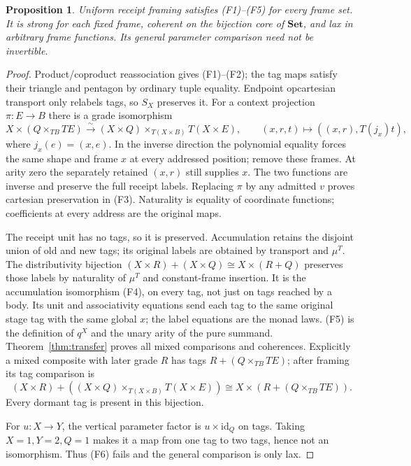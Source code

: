 \documentclass[11pt,a4paper]{article}
\newtheorem{proposition}[theorem]{Proposition}
\theoremstyle{definition}
\newcommand{\Set}{\mathbf{Set}}
\newcommand{\id}{\mathrm{id}}
\begin{document}
\begin{proposition}\label{prop:receipt-positive}
Uniform receipt framing satisfies \textup{(F1)--(F5)} for every frame set.
It is strong for each fixed frame, coherent on the bijection core of
$\Set$, and lax in arbitrary frame functions. Its general parameter
comparison need not be invertible.
\end{proposition}
\begin{proof}
Product/coproduct reassociation gives (F1)--(F2); the tag maps satisfy their
triangle and pentagon by ordinary tuple equality. Endpoint opcartesian
transport only relabels tags, so $S_X$ preserves it. For a context projection
$\pi:E\to B$ there is a grade isomorphism
\begin{equation}\label{eq:receipt-lift}
 X\times(Q\times_{TB}TE)
 \xrightarrow{\sim}(X\times Q)\times_{T(X\times B)}T(X\times E),
 \qquad(x,r,t)\longmapsto((x,r),T(j_x)t),
\end{equation}
where $j_x(e)=(x,e)$. In the inverse direction the polynomial equality
forces the same shape and frame $x$ at every addressed position; remove
these frames. At arity zero the separately retained $(x,r)$ still supplies
$x$. The two functions are inverse and preserve the full receipt labels.
Replacing $\pi$ by any admitted $v$ proves cartesian preservation in (F3).
Naturality is equality of coordinate functions; coefficients at every
address are the original maps.

The receipt unit has no tags, so it is preserved. Accumulation retains the
disjoint union of old and new tags; its original labels are obtained by
transport and $\mu^T$. The distributivity bijection
$(X\times R)+(X\times Q)\cong X\times(R+Q)$ preserves those labels by
naturality of $\mu^T$ and constant-frame insertion. It is the accumulation
isomorphism (F4), on every tag, not just on tags reached by a body.
Its unit and associativity equations send each tag to the same original
stage tag with the same global $x$; the label equations are the monad laws.
(F5) is the definition of $q^X$ and the unary arity of the pure summand.
Theorem~\ref{thm:transfer} proves all mixed comparisons and coherences.
Explicitly a mixed composite with later grade $R$ has tags
$R+(Q\times_{TB}TE)$; after framing its tag comparison is
\[
 (X\times R)+((X\times Q)\times_{T(X\times B)}T(X\times E))
 \cong X\times(R+(Q\times_{TB}TE)).
\]
Every dormant tag is present in this bijection.

For $u:X\to Y$, the vertical parameter factor is $u\times\id_Q$ on tags.
Taking $X=1,Y=2,Q=1$ makes it a map from one tag to two tags, hence not an
isomorphism. Thus (F6) fails and the general comparison is only lax.
\end{proof}
\end{document}
